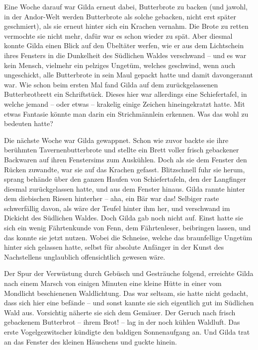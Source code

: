 \documentclass[10pt, a4paper, oneside]{book}
\begin{document}
Eine Woche darauf war Gilda erneut dabei, Butterbrote zu backen (und jawohl, in der Andor-Welt werden Butterbrote als solche gebacken, nicht erst später geschmiert), als sie erneut hinter sich ein Krachen vernahm. Die Brote zu retten vermochte sie nicht mehr, dafür war es schon wieder zu spät. Aber diesmal konnte Gilda einen Blick auf den Übeltäter werfen, wie er aus dem Lichtschein ihres Fensters in die Dunkelheit des Südlichen Waldes verschwand – und es war kein Mensch, vielmehr ein pelziges Ungetüm, welches geschwind, wenn auch ungeschickt, alle Butterbrote in sein Maul gepackt hatte und damit davongerannt war. Wie schon beim ersten Mal fand Gilda auf dem zurückgelassenen Butterbrotbrett ein Schriftstück. Dieses hier war allerdings eine Schiefertafel, in welche jemand – oder etwas – krakelig einige Zeichen hineingekratzt hatte. Mit etwas Fantasie könnte man darin ein Strichmännlein erkennen. Was das wohl zu bedeuten hatte?

Die nächste Woche war Gilda gewappnet. Schon wie zuvor backte sie ihre berühmten Tavernenbutterbrote und stellte ein Brett voller frisch gebackener Backwaren auf ihren Fenstersims zum Auskühlen. Doch als sie dem Fenster den Rücken zuwandte, war sie auf das Krachen gefasst. Blitzschnell fuhr sie herum, sprang behände über den ganzen Haufen von Schiefertafeln, den der Langfinger diesmal zurückgelassen hatte, und aus dem Fenster hinaus. Gilda rannte hinter dem diebischen Riesen hinterher – aha, ein Bär war das! Selbiger raste schwerfällig davon, als wäre der Teufel hinter ihm her, und verschwand im Dickicht des Südlichen Waldes. Doch Gilda gab noch nicht auf. Einst hatte sie sich ein wenig Fährtenkunde von Fenn, dem Fährtenleser, beibringen lassen, und das konnte sie jetzt nutzen. Wobei die Schneise, welche das braunfellige Ungetüm hinter sich gelassen hatte, selbst für absolute Anfänger in der Kunst des Nachstellens unglaublich offensichtlich gewesen wäre.

Der Spur der Verwüstung durch Gebüsch und Gesträuche folgend, erreichte Gilda nach einem Marsch von einigen Minuten eine kleine Hütte in einer vom Mondlicht beschienenen Waldlichtung. Das war seltsam, sie hatte nicht gedacht, dass sich hier eine befände – und sonst kannte sie sich eigentlich gut im Südlichen Wald aus. Vorsichtig näherte sie sich dem Gemäuer. Der Geruch nach frisch gebackenem Butterbrot – ihrem Brot! – lag in der noch kühlen Waldluft. Das erste Vogelgezwitscher kündigte den baldigen Sonnenaufgang an. Und Gilda trat an das Fenster des kleinen Häuschens und guckte hinein.
\end{document}
